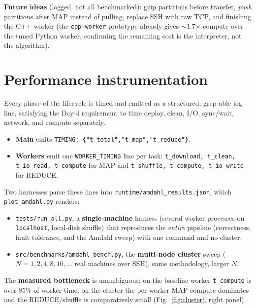\documentclass[11pt,a4paper]{article}
\newcommand{\code}[1]{\texttt{\small #1}}
\begin{document}
\textbf{Future ideas} (logged, not all benchmarked): gzip partitions before
transfer, \emph{push} partitions after MAP instead of pulling, replace SSH with
raw TCP, and finishing the C++ worker (the \code{cpp-worker} prototype already
gives $\sim$1.7$\times$ compute over the tuned Python worker, confirming the
remaining cost is the interpreter, not the algorithm).

\section{Performance instrumentation}\label{sec:perf}

Every phase of the lifecycle is timed and emitted as a structured, grep-able log
line, satisfying the Day-4 requirement to time deploy, clean, I/O, sync/wait,
network, and compute separately.

\begin{itemize}
\item \textbf{Main} emits \code{TIMING: \{"t\_total","t\_map","t\_reduce"\}}.
\item \textbf{Workers} emit one \code{WORKER\_TIMING} line per task:
\code{t\_download, t\_clean, t\_io\_read, t\_compute} for MAP and
\code{t\_shuffle, t\_compute, t\_io\_write} for REDUCE.
\end{itemize}

Two harnesses parse these lines into \code{runtime/amdahl\_results.json}, which
\code{plot\_amdahl.py} renders:

\begin{itemize}
\item \code{tests/run\_all.py}, a \textbf{single-machine} harness (several
worker processes on \code{localhost}, local-disk shuffle) that reproduces the
\emph{entire} pipeline (correctness, fault tolerance, and the Amdahl sweep)
with one command and no cluster.
\item \code{src/benchmarks/amdahl\_bench.py}, the \textbf{multi-node cluster}
sweep ($N=1,2,4,8,16,\dots$ real machines over SSH), same methodology, larger $N$.
\end{itemize}

The \textbf{measured bottleneck} is unambiguous: on the baseline worker
\code{t\_compute} is over 85\% of worker time; on the cluster the per-worker MAP
compute dominates and the REDUCE/shuffle is comparatively small
(Fig.~\ref{fig:cluster}, right panel).
\end{document}
